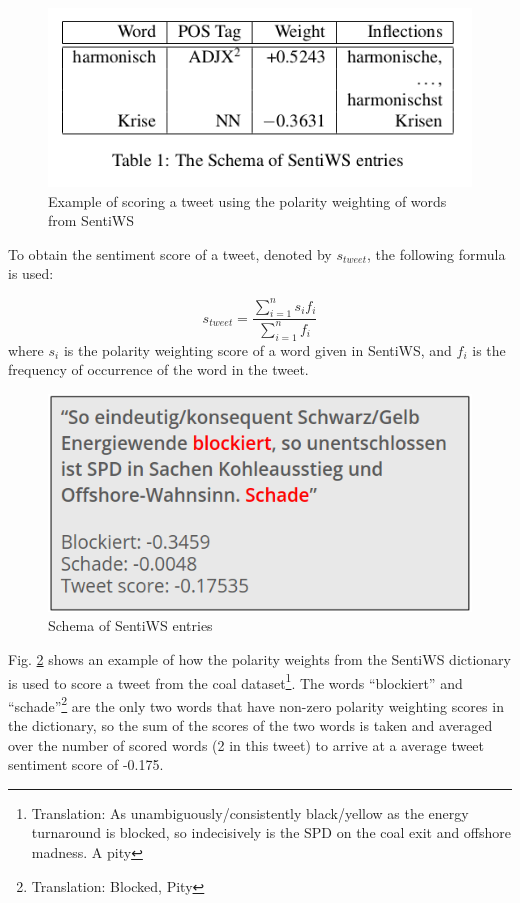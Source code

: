 \documentclass[12pt,onecolumn,twoside]{layout}
\begin{document}
\begin{figure} 
	\begin{center}
		\includegraphics[width=0.5\linewidth]{figures/sentiws_example}
	\end{center}
	\caption{Example of scoring a tweet using the polarity weighting of words from SentiWS}
	\label{fig:sentiws_example}
\end{figure}

To obtain the sentiment score of a tweet, denoted by \(s_{tweet}\), the following formula is used: 

\begin{equation}
\label{eq:word_score}
s_{tweet} = \frac{\sum_{i=1}^{n} s_i f_i}{\sum_{i=1}^{n} f_i}
\end{equation} 
where \(s_i\) is the polarity weighting score of a word given in SentiWS, and \(f_i\) is the frequency of occurrence of the word in the tweet. 

\begin{figure} 
	\begin{center}
		\includegraphics[width=0.5\linewidth]{figures/sentiws_example_use}
	\end{center}
	\caption{Schema of SentiWS entries}
	\label{fig:sentiws_example_use}
\end{figure}

Fig. \ref{fig:sentiws_example_use} shows an example of how the polarity weights from the SentiWS dictionary is used to score a tweet from the coal dataset\footnote{Translation: As unambiguously/consistently black/yellow as the energy turnaround is blocked, so indecisively is the SPD on the coal exit and offshore madness. A pity}. The words ``blockiert'' and ``schade''\footnote{Translation: Blocked, Pity} are the only two words that have non-zero polarity weighting scores in the dictionary, so the sum of the scores of the two words is taken and averaged over the number of scored words (2 in this tweet) to arrive at a average tweet sentiment score of -0.175. 
\end{document}
